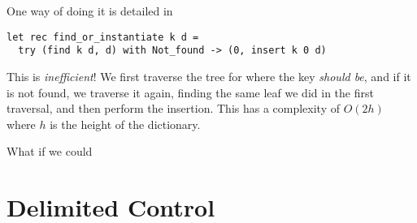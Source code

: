 One way of doing it is detailed in 

\begin{code}
\label{code:ocaml-inefficient-update}
\begin{verbatim}
let rec find_or_instantiate k d =
  try (find k d, d) with Not_found -> (0, insert k 0 d)
\end{verbatim}
\end{code}

This is \textit{inefficient}! We first traverse the tree for where the key \textit{should be}, and if it is not found, we traverse it again, finding the same leaf we did in the first traversal, and then perform the insertion. This has a complexity of $O(2h)$ where $h$ is the height of the dictionary.

What if we could 
\section{Delimited Control\optional}